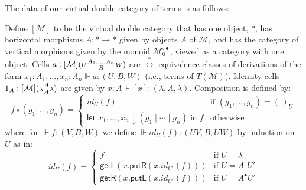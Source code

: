 \documentclass[twoside,11pt,final]{entics}
\newcommand{\getl}{\mathsf{getL}}
\newcommand{\putr}{\mathsf{putR}}
\newcommand{\getr}{\mathsf{getR}}
\newcommand{\putl}{\mathsf{putL}}
\newcommand{\ex}[1]{{#1}^{\circ\bullet}}
\newcommand{\cells}[4]{({\scriptstyle #1} {{\scriptstyle #2} \atop {\scriptstyle #3}} {\scriptstyle #4})}
\newcommand{\asn}{\downarrow}
\newcommand{\seq}{,\!\ldots\!,}
\begin{document}
The data of our virtual double category of terms is as follows:
\begin{definition}
  Define $[\mathcal{M}]$ to be the virtual double category that has one object, $*$, has horizontal morphisms $A : * \to *$ given by objects $A$ of $\mathcal{M}$, and has the category of vertical morphisms given by the monoid $\ex{\mathcal{M}}_0$, viewed as a category with one object. Cells $a : [\mathcal{M}]\cells{U}{A_1 ,\ldots,A_n}{B}{W}$ are $\stackrel{*}{\leftrightarrow}$-equivalence classes of derivations of the form $x_1 {:} A_1 \seq x_n {:} A_n \Vdash a : (U,B,W)$ (i.e., terms of $T(\mathcal{M})$). Identity cells $1_A : [\mathcal{M}]\cells{\lambda}{A}{A}{\lambda}$ are given by $x : A \Vdash [x] : (\lambda,A,\lambda)$. Composition is defined by:
  \[
    f \circ (g_1,\ldots,g_n) =
    \begin{cases}
      id_U(f) &\text{if }  (g_1,\ldots,g_n) = (\,)_U\\
      \textsf{let } x_1,\ldots,x_n \asn (g_1 \mid \cdots \mid g_n) \textsf{ in } f &\text{otherwise}
    \end{cases}
  \]
  where for $\Vdash f : (V,B,W)$ we define $\Vdash id_U(f) : (UV,B,UW)$ by induction on $U$ as in:
  \[
    id_U(f) =
    \begin{cases}
      f &\text{if } U = \lambda \\
      \getl(x.\putr(x.id_{U'}(f))) &\text{if } U = A^\circ U'\\
      \getr(x.\putl(x.id_{U'}(f))) &\text{if } U = A^\bullet U'
    \end{cases}
  \]
\end{definition}
\end{document}
